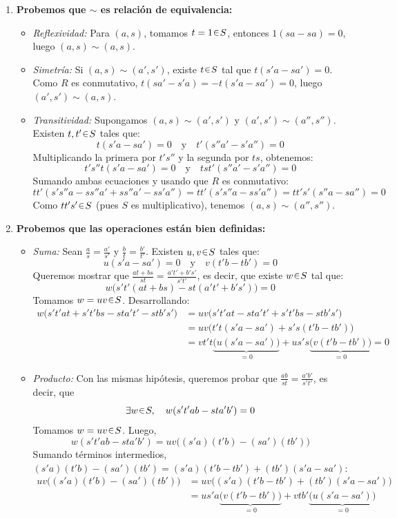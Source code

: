 \begin{sol}[Demostración]
\begin{enumerate}[label=(\alph*)]
\item \textbf{Probemos que $\sim$ es relación de equivalencia:}
\begin{itemize}
\item \emph{Reflexividad:} Para $(a,s)$, tomamos $t=1 \en S$, entonces $1(sa - sa) = 0$, luego $(a,s) \sim (a,s)$.

\item \emph{Simetría:} Si $(a,s) \sim (a',s')$, existe $t \en S$ tal que $t(s'a - sa') = 0$. Como $R$ es conmutativo, $t(sa' - s'a) = -t(s'a - sa') = 0$, luego $(a',s') \sim (a,s)$.

\item \emph{Transitividad:} Supongamos $(a,s) \sim (a',s')$ y $(a',s') \sim (a'',s'')$. Existen $t,t' \en S$ tales que:
\[
t(s'a - sa') = 0 \quad \text{y} \quad t'(s''a' - s'a'') = 0
\]
Multiplicando la primera por $t's''$ y la segunda por $ts$, obtenemos:
\[
t's''t(s'a - sa') = 0 \quad \text{y} \quad tst'(s''a' - s'a'') = 0
\]
Sumando ambas ecuaciones y usando que $R$ es conmutativo:
\[
tt'(s's''a - ss''a' + ss''a' - ss'a'') = tt'(s's''a - ss'a'') = tt's'(s''a-sa'') = 0
\]
Como $tt's' \en S$ (pues $S$ es multiplicativo), tenemos $(a,s) \sim (a'',s'')$.
\end{itemize}

\item \textbf{Probemos que las operaciones están bien definidas:}
\begin{itemize}
\item \emph{Suma:} Sean $\frac{a}{s} = \frac{a'}{s'}$ y $\frac{b}{t} = \frac{b'}{t'}$. Existen $u,v \en S$ tales que:
\[
u(s'a - sa') = 0 \quad \text{y} \quad v(t'b - tb') = 0
\]
Queremos mostrar que $\frac{at + bs}{st} = \frac{a't' + b's'}{s't'}$, es decir, que existe $w \en S$ tal que:
\[
w\big(s't'(at + bs) - st(a't' + b's')\big) = 0
\]
Tomamos $w = uv \en S$. Desarrollando:
\begin{align*}
w\big(s't'at + s't'bs - sta't' - stb's'\big)%
&= uv\big(s't'at - sta't' + s't'bs - stb's'\big) \\
&= uv\big(t't(s'a - sa') + s's(t'b - tb')\big)\\
&= vt't\underbrace{\big(u(s'a - sa')\big)}_{=0} + us's\underbrace{\big(v(t'b - tb')\big)}_{=0} = 0
\end{align*}

\item \emph{Producto:} Con las mismas hipótesis, queremos probar que $\frac{ab}{st} = \frac{a'b'}{s't'}$, es decir, que
\[
\exists w\en S,\quad
w(s't'ab - sta'b') = 0
\]
Tomamos $w = uv \en S$. Luego,
\[
w(s't'ab - sta'b') = uv\big((s'a)(t'b) - (sa')(tb')\big)
\]
Sumando términos intermedios, $(s'a)(t'b) - (sa')(tb') = (s'a)(t'b - tb') + (tb')(s'a - sa')$:
\begin{align*}
uv\big((s'a)(t'b) - (sa')(tb')\big)%
&= uv\big( (s'a)(t'b - tb') + (tb')(s'a - sa') \big)\\
&= us'a\underbrace{\big(v(t'b - tb')\big)}_{=0} + vtb'\underbrace{\big(u(s'a - sa')\big)}_{=0}
\end{align*}
\end{itemize}


\end{enumerate}
\end{sol}
